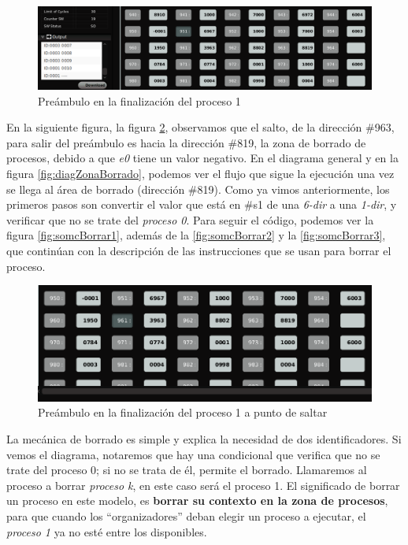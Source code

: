 \documentclass[letterpaper,12pt,oneside]{book}
\begin{document}
		
		\begin{figure}[h]		
			\centering
			\includegraphics[scale=0.4]{media/CARDIACC/proceso1FinishPream_cutted.png}
			\caption{ Preámbulo en la finalización del proceso 1}
			\label{fig:proceso1FinishPream}
		\end{figure}
		
		En la siguiente figura, la figura \ref{fig:proceso1FinishPream2}, observamos que el 
		salto, de la dirección \#963,
		para salir del preámbulo es hacia la dirección \#819, la zona de borrado de procesos,
		debido a que \textit{e0} tiene un valor negativo. En el diagrama general y en la figura \ref{fig:diagZonaBorrado}, podemos
		ver el flujo que sigue la ejecución una vez se llega al área de borrado (dirección \#819).
		Como ya vimos anteriormente, los primeros pasos son convertir
		el valor que está en \#s1 de una \textit{6-dir} a una \textit{1-dir}, y verificar que no se trate del \textit{proceso 0}. Para seguir
		el código, podemos ver la figura \ref{fig:somcBorrar1}, además de la \ref{fig:somcBorrar2} y la \ref{fig:somcBorrar3}, que
		continúan con la descripción de las instrucciones que se usan para 
		borrar el proceso.
		
		
		\begin{figure}[h]		
			\centering
			\includegraphics[scale=0.4]{media/CARDIACC/proceso1FinishPream2_cut.png}
			\caption{ Preámbulo en la finalización del proceso 1 a punto de saltar}
			\label{fig:proceso1FinishPream2}
		\end{figure}
		
		La mecánica de borrado es simple y explica la necesidad de dos identificadores. Si vemos el diagrama, notaremos que
		hay una condicional que verifica que no se trate del proceso 0; si no se trata de él, permite el borrado. Llamaremos al proceso
		a borrar \textit{proceso k}, en este caso será el proceso 1. El significado de borrar un proceso en este modelo,
		es \textbf{borrar su contexto en la zona de procesos}, para que cuando los ``organizadores''  deban elegir un proceso a ejecutar,
		el \textit{proceso 1} ya no esté entre los disponibles.
		
\end{document}

